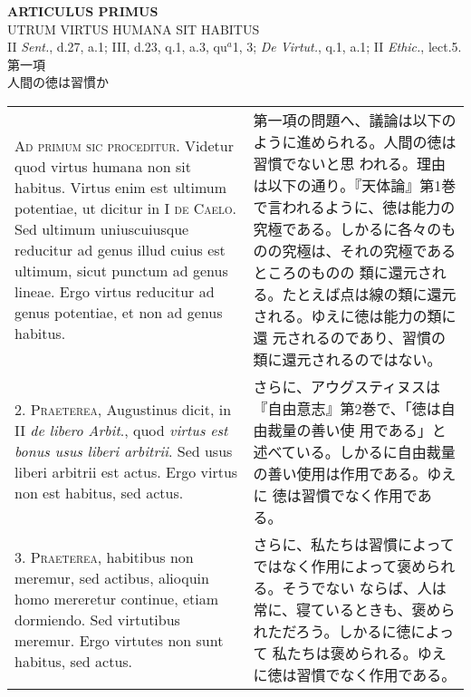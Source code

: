 \documentclass[10pt]{jsarticle}
\begin{document}
\newpage
{}
\begin{center}
{\Large {\bf ARTICULUS PRIMUS}}\\
{\large UTRUM VIRTUS HUMANA SIT HABITUS}\\
{\footnotesize II {\itshape Sent.}, d.27, a.1; III, d.23, q.1, a.3, qu$^{a}$1, 3; {\itshape De Virtut.}, q.1, a.1; II {\itshape Ethic.}, lect.5.}\\
{\Large 第一項\\人間の徳は習慣か}
\end{center}

\begin{longtable}{p{21em}p{21em}}

{\scshape Ad primum sic proceditur}. Videtur quod virtus humana non
sit habitus. Virtus enim est ultimum potentiae, ut dicitur in I
{\scshape de Caelo}. Sed ultimum uniuscuiusque reducitur ad genus
illud cuius est ultimum, sicut punctum ad genus lineae. Ergo virtus
reducitur ad genus potentiae, et non ad genus habitus.

&

第一項の問題へ、議論は以下のように進められる。人間の徳は習慣でないと思
われる。理由は以下の通り。『天体論』第1巻で言われるように、徳は能力の
究極である。しかるに各々のものの究極は、それの究極であるところのものの
類に還元される。たとえば点は線の類に還元される。ゆえに徳は能力の類に還
元されるのであり、習慣の類に還元されるのではない。

\\

2. {\scshape Praeterea}, Augustinus dicit, in II {\itshape de libero
Arbit}., quod {\itshape virtus est bonus usus liberi arbitrii}. Sed
usus liberi arbitrii est actus. Ergo virtus non est habitus, sed
actus.

&

さらに、アウグスティヌスは『自由意志』第2巻で、「徳は自由裁量の善い使
用である」と述べている。しかるに自由裁量の善い使用は作用である。ゆえに
徳は習慣でなく作用である。

\\

3. {\scshape Praeterea}, habitibus non meremur, sed actibus, alioquin
homo mereretur continue, etiam dormiendo. Sed virtutibus meremur. Ergo
virtutes non sunt habitus, sed actus.

&

さらに、私たちは習慣によってではなく作用によって褒められる。そうでない
ならば、人は常に、寝ているときも、褒められただろう。しかるに徳によって
私たちは褒められる。ゆえに徳は習慣でなく作用である。


\end{longtable}
\end{document}
